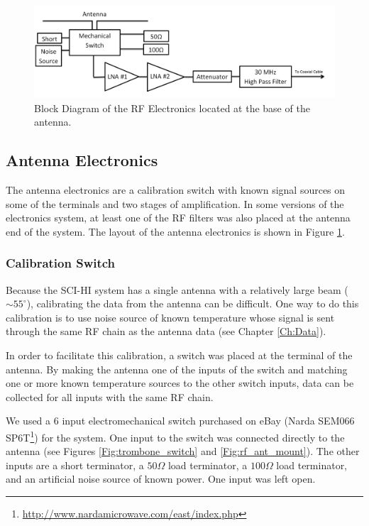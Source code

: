 \begin{figure}[htb]
\begin{center}
\includegraphics[width=0.9\linewidth]{SCIHI_system/figures/antenna_rf_block_diagram.png}
\caption{Block Diagram of the RF Electronics located at the base of the antenna.}
\label{Fig:antenna_RF_block_diagram}
\end{center}
\end{figure}


\subsection{Antenna Electronics}

The antenna electronics are a calibration switch with known signal sources on some of the terminals and two stages of amplification. In some versions of the electronics system, at least one of the RF filters was also placed at the antenna end of the system. The layout of the antenna electronics is shown in Figure \ref{Fig:antenna_RF_block_diagram}. 

\subsubsection{Calibration Switch} \label{Sec:switch}

Because the SCI-HI system has a single antenna with a relatively large beam ($\sim 55^\circ$), calibrating the data from the antenna can be difficult. One way to do this calibration is to use noise source of known temperature whose signal is sent through the same RF chain as the antenna data (see Chapter \ref{Ch:Data}). 

In order to facilitate this calibration, a switch was placed at the terminal of the antenna. By making the antenna one of the inputs of the switch and matching one or more known temperature sources to the other switch inputs, data can be collected for all inputs with the same RF chain. 

We used a 6 input electromechanical switch purchased on eBay (Narda SEM066 SP6T\footnote{\url{http://www.nardamicrowave.com/east/index.php}}) for the system. One input to the switch was connected directly to the antenna (see Figures \ref{Fig:trombone_switch} and \ref{Fig:rf_ant_mount}). The other inputs are a short terminator, a $50 \Omega$ load terminator, a $100 \Omega$ load terminator, and an artificial noise source of known power. One input was left open. 

